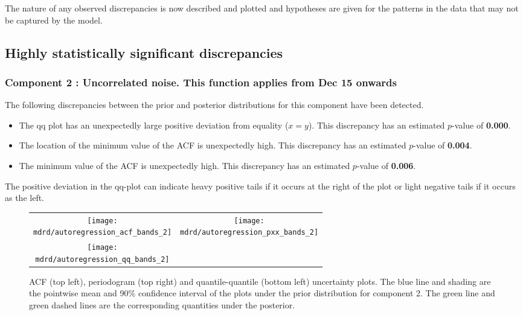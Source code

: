 \documentclass{article} %
\begin{document}
The nature of any observed discrepancies is now described and plotted and hypotheses are given for the patterns in the data that may not be captured by the model.

\subsection{Highly statistically significant discrepancies}

\subsubsection{Component 2 : Uncorrelated noise. This function applies from Dec   15 onwards}


The following discrepancies between the prior and posterior distributions for this component have been detected.

\begin{itemize}

    \item The qq plot has an unexpectedly large positive deviation from equality ($x = y$). This discrepancy has an estimated $p$-value of \textbf{0.000}.
    \item The location of the minimum value of the ACF is unexpectedly high. This discrepancy has an estimated $p$-value of \textbf{0.004}.
    \item The minimum value of the ACF is unexpectedly high. This discrepancy has an estimated $p$-value of \textbf{0.006}.
\end{itemize}

The positive deviation in the qq-plot can indicate heavy positive tails if it occurs at the right of the plot or light negative tails if it occurs as the left.


\begin{figure}[H]
\newcommand{\wmgd}{0.5\columnwidth}
\newcommand{\hmgd}{3.0cm}
\newcommand{\mdrd}{autoregression}
\newcommand{\mbm}{\hspace{-0.3cm}}
\begin{tabular}{cc}
\mbm \texttt{[image: \\mdrd/autoregression\_acf\_bands\_2]} & \texttt{[image: \\mdrd/autoregression\_pxx\_bands\_2]} \\
\mbm \texttt{[image: \\mdrd/autoregression\_qq\_bands\_2]}
\end{tabular}
\caption{
ACF (top left), periodogram (top right) and quantile-quantile (bottom left) uncertainty plots.
The blue line and shading are the pointwise mean and 90\% confidence interval of the plots under the prior distribution for component 2.
The green line and green dashed lines are the corresponding quantities under the posterior.}
\label{fig:check2}
\end{figure}
\end{document}
